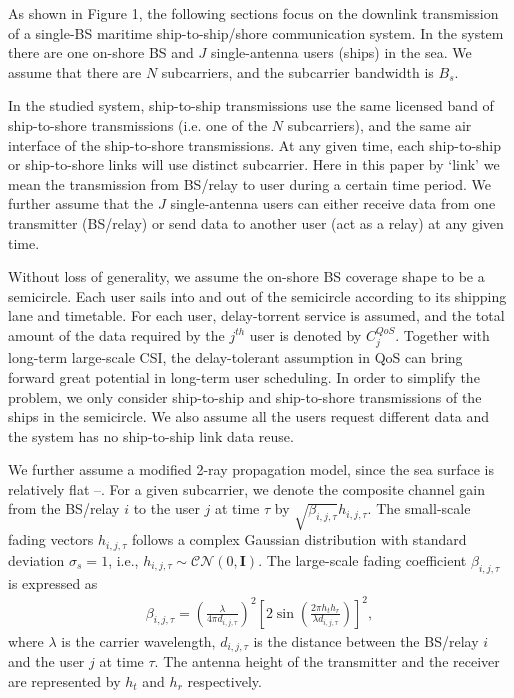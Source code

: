 \documentclass{ieeeaccess}
\begin{document}

As shown in Figure 1, the following sections focus on the downlink transmission of a single-BS maritime ship-to-ship/shore communication system. In the system there are one on-shore BS
and  $J$ single-antenna users (ships) in the sea. We assume that there are $N$ subcarriers, and the subcarrier bandwidth is ${B_s}$. 

In the studied system, ship-to-ship transmissions use the same licensed band of ship-to-shore transmissions (i.e. one of the $N$ subcarriers), and the same air interface of the ship-to-shore transmissions. 
At any given time, each ship-to-ship or ship-to-shore links will use distinct subcarrier. Here in this paper by `link' we mean the transmission from BS/relay to user during a certain time period. We further assume that the $J$ single-antenna users can either receive data from one transmitter (BS/relay) or send data to another user (act as a relay) at any given time.

Without loss of generality, we assume the on-shore BS coverage shape to be a semicircle. 
Each user sails into and out of the semicircle according to its shipping lane and timetable. For each user, delay-torrent service is assumed, and the total amount of the data required by the ${j^{th}}$ user is denoted by $C_j^{QoS}$. Together with long-term large-scale CSI, the delay-tolerant assumption in QoS can bring forward great potential in long-term user scheduling. 
In order to simplify the problem, we only consider ship-to-ship and ship-to-shore transmissions of the ships in the semicircle. We also assume all the users request different data and the system has no ship-to-ship link data reuse.

We further assume a modified 2-ray propagation model, since the sea surface is relatively flat \cite{p0}--\cite{p2}. For a given subcarrier, we denote the composite channel gain from the BS/relay $i$ to the user $j$ at time $\tau $ by $\sqrt {{\beta _{i,j,\tau }}} {h_{i,j,\tau }}$. The small-scale fading vectors ${h_{i,j,\tau }}$ follows a complex Gaussian distribution with standard deviation ${\sigma _s} = 1$, i.e., ${h_{i,j,\tau }} \sim \mathcal{CN}(0, \mathbf{I})$. The large-scale fading coefficient ${\beta _{i,j,\tau }}$ is expressed as
\begin{align}
{\beta _{i,j,\tau }} = {\left( {\frac{\lambda }{{4\pi {d_{i,j,\tau }}}}} \right)^2}{\left[ {2\sin \left( {\frac{{2\pi {h_t}{h_r}}}{{\lambda {d_{i,j,\tau }}}}} \right)} \right]^2} ,
\end{align}
where $\lambda $ is the carrier wavelength, ${d_{i,j,\tau }}$ is the distance between the BS/relay $i$ and the user $j$ at time $\tau $. The antenna height of the transmitter and the receiver are represented by $h_t$ and $h_r$ respectively.
\end{document}
